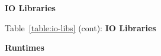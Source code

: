 \begin{table}[h!]
\caption{\bf IO Libraries} \vspace*{\captionSpace{}} \label{table:io-libs}

\vspace*{\tabSpaceBot{}}
\end{table}

\begin{table}[h!]
\caption*{Table~\ref{table:io-libs} (cont): {\bf IO Libraries} \vspace*{\captionSpace{}} }

\vspace*{\tabSpaceBot{}}
\end{table}

\begin{table}[h!]
\caption{\bf Runtimes} \vspace*{\captionSpace{}} \label{table:runtimes}

\vspace*{\tabSpaceBot{}}
\end{table}

